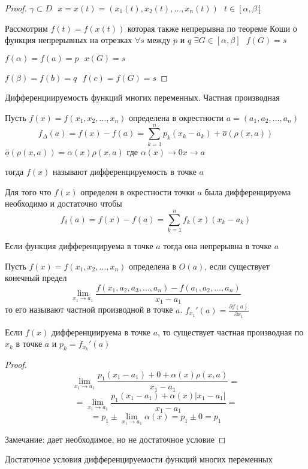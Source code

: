 \begin{proof}
  $\gamma \subset D ~~~ x = x(t) = (x_1(t), x_2(t), \ldots, x_n(t)) ~~~
  t \in [\alpha, \beta]$

  Рассмотрим $f(t) = f(x(t))$ которая также непрерывна по теореме Коши о
  функция непрерывных на отрезках $\forall s$ между $p$ и $q$
  $\exists G \in [\alpha, \beta] ~~~ f(G) = s$

  $f(\alpha) = f(a) = p ~~~ x(G) = s$

  $f(\beta) = f(b) = q ~~~ f(c) = f(G) = s$
\end{proof}

\begin{title}[\Large]
  Дифференциируемость функций многих переменных. Частная производная
\end{title}

\begin{define}
  Пусть $f(x) = f(x_1, x_2, \ldots, x_n)$ определена в окрестности
  $a = (a_1, a_2, \ldots, a_n)$
  $$
  f_{\Delta}(a) = f(x) - f(a) = \sum_{k=1}^n p_k (x_k - a_k) +
  \stackrel{-}{o}(\rho(x, a))
  $$
  $\stackrel{-}{o}(\rho(x, a)) = \alpha(x) \rho(x, a)$ где $\alpha(x) \to 0
  x \to a$

  тогда $f(x)$ называют дифференцируемость в точке $a$
\end{define}

\begin{block}[Критерий]
  Для того что $f(x)$ определен в окрестности точки $a$ была дифференцируема
  необходимо и достаточно чтобы
  $$
  f_{\delta}(a) = f(x) - f(a) = \sum_{k=1}^n f_k(x)(x_k - a_k)
  $$
\end{block}

\begin{theorem}
  Если функция дифференцируема в точке $a$ тогда она непрерывна в точке $a$
\end{theorem}

\begin{define}
  Пусть $f(x) = f(x_1, x_2, \ldots, x_n)$ определена в $O(a)$, если существует
  конечный предел
  $$
  \lim_{x_1 \to a_1}
  \frac{f(x_1, a_2, a_3, \ldots, a_n) - f(a_1, a_2, \ldots, a_n)}{x_1 - a_1}
  $$
  то его называют частной производной в точке $a$. $f_{x_1}'(a) =
  \frac{\partial f(a)}{\partial x_1}$
\end{define}

\begin{theorem}
  Если $f(x)$ дифференциируема в точке $a$, то существует частная производная
  по $x_k$ в точке $a$ и $p_k = f_{x_k}'(a)$
\end{theorem}

\begin{proof}
  $$
  \lim_{x_1 \to a_1}
  \frac{p_1(x_1 - a_1) + 0 + \alpha(x) \rho(x, a)}{x_1 - a_1} =
  $$
  $$
  = \lim_{x_1 \to a_1}
  \frac{p_1(x_1 - a_1) + \alpha(x) |x_1 - a_1|}{x_1 - a_1} =
  $$
  $$
  = p_1 \pm \lim_{x_1 \to a_1} \alpha(x) = p_1 \pm 0 = p_1
  $$

  Замечание: дает необходимое, но не достаточное условие
\end{proof}

\begin{title}[\Large]
  Достаточное условия дифференцируемости функций многих переменных
\end{title}